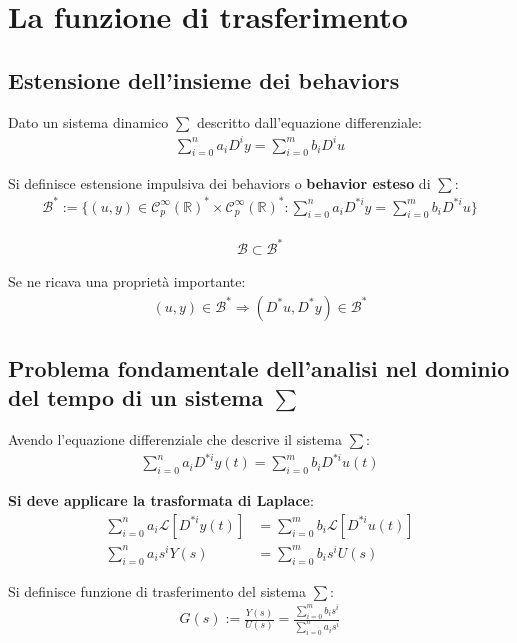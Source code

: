 \section{La funzione di trasferimento}
\subsection{Estensione dell'insieme dei behaviors}

Dato un sistema dinamico $\sum$ descritto dall'equazione differenziale:
\begin{align}
  \sum_{i=0}^n a_i D^i y = \sum_{i=0}^m b_i D^i u
\end{align}

Si definisce estensione impulsiva dei behaviors o \textbf{behavior esteso} di $\sum$:
\begin{align}
  \mathcal{B}^* := \{ (u, y) \in \mathcal{C}_p^{\infty} (\mathbb{R})^* \times \mathcal{C}_p^{\infty} (\mathbb{R})^* : \sum_{i=0}^n a_i D^{*i} y = \sum_{i=0}^m b_i D^{*i} u \}
\end{align}

\begin{align}
  \mathcal{B} \subset \mathcal{B}^*
\end{align}

Se ne ricava una proprietà importante:
\begin{align}
  (u, y) \in \mathcal{B}^* \Rightarrow (D^* u, D^*y) \in \mathcal{B^*}
\end{align}


\subsection{Problema fondamentale dell'analisi nel dominio del tempo di un sistema $\sum$}

Avendo l'equazione differenziale che descrive il sistema $\sum$:
\begin{align}
  \sum_{i=0}^n a_i D^{*i} y(t) = \sum_{i=0}^m b_i D^{*i} u(t)
\end{align}

\textbf{Si deve applicare la trasformata di Laplace}:
\begin{align}
  \sum_{i=0}^n a_i \mathcal{L}[  D^{*i} y(t) ] &= \sum_{i=0}^m b_i \mathcal{L}[ D^{*i} u(t) ] \\
  \sum_{i=0}^n a_i s^i Y(s) &= \sum_{i=0}^m b_i s^i U(s)
\end{align}

Si definisce funzione di trasferimento del sistema $\sum$:
\begin{align}
  G(s) := \frac{Y(s)}{U(s)} = \frac{\sum_{i=0}^m b_i s^i}{\sum_{i=0}^n a_i s^i}
  \label{eq:funzione_trasferimento}
\end{align}



